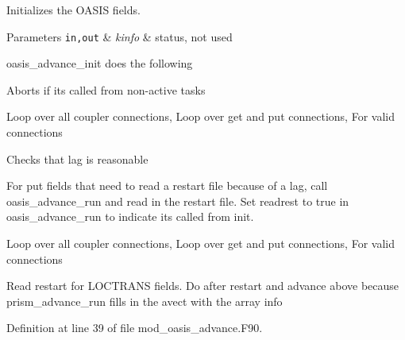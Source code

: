 Initializes the O\+A\+S\+IS fields. 


\begin{DoxyParams}[1]{Parameters}
\mbox{\tt in,out}  & {\em kinfo} & status, not used \\
\hline
\end{DoxyParams}
oasis\+\_\+advance\+\_\+init does the following
\begin{DoxyItemize}
\item Aborts if it\textquotesingle{}s called from non-\/active tasks
\item Loop over all coupler connections, Loop over get and put connections, For valid connections
\begin{DoxyItemize}
\item Checks that lag is reasonable
\item For put fields that need to read a restart file because of a lag, call oasis\+\_\+advance\+\_\+run and read in the restart file. Set readrest to true in oasis\+\_\+advance\+\_\+run to indicate it\textquotesingle{}s called from init.
\end{DoxyItemize}
\item Loop over all coupler connections, Loop over get and put connections, For valid connections
\begin{DoxyItemize}
\item Read restart for L\+O\+C\+T\+R\+A\+NS fields. Do after restart and advance above because prism\+\_\+advance\+\_\+run fills in the avect with the array info 
\end{DoxyItemize}
\end{DoxyItemize}

Definition at line 39 of file mod\+\_\+oasis\+\_\+advance.\+F90.

\mbox{\label{namespacemod__oasis__advance_a0514c843d051b8ee16adfb349eaee6a7}} 
